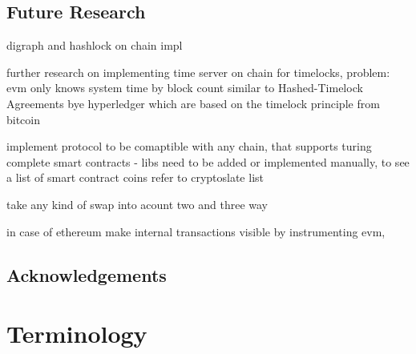 \section{Future Research}
\label{sec:background:futureresearch}

digraph and hashlock on chain impl

further research on implementing time server on chain for timelocks, problem: evm only knows system time by block count
similar to \cite{HTLAs} Hashed-Timelock Agreements bye hyperledger which are based on the timelock principle from bitcoin \cite{timelock}

implement protocol to be comaptible with any chain, that supports turing complete smart contracts
- libs need to be added or implemented manually, to see a list of smart contract coins refer to cryptoslate list \cite{smart_contract_coins}

take any kind of swap into acount two and three way

in case of ethereum make internal transactions visible by  instrumenting evm, \cite{instrumenting_evm}

\section{Acknowledgements}
\label{sec:background:acknowledgements}


\chapter{Terminology}
\label{ch:chapter06}

